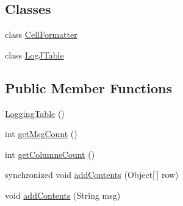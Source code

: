 \subsection*{Classes}
\begin{DoxyCompactItemize}
\item 
class \hyperlink{classit_1_1emarolab_1_1cagg_1_1debugging_1_1baseComponents_1_1LoggingTable_1_1CellFormatter}{Cell\-Formatter}
\item 
class \hyperlink{classit_1_1emarolab_1_1cagg_1_1debugging_1_1baseComponents_1_1LoggingTable_1_1LogJTable}{Log\-J\-Table}
\end{DoxyCompactItemize}
\subsection*{Public Member Functions}
\begin{DoxyCompactItemize}
\item 
\hyperlink{classit_1_1emarolab_1_1cagg_1_1debugging_1_1baseComponents_1_1LoggingTable_a392c75204c792ce527a4376153d33822}{Logging\-Table} ()
\item 
int \hyperlink{classit_1_1emarolab_1_1cagg_1_1debugging_1_1baseComponents_1_1LoggingTable_a9e6c594828ac1de856b271b91cb24795}{get\-Msg\-Count} ()
\item 
int \hyperlink{classit_1_1emarolab_1_1cagg_1_1debugging_1_1baseComponents_1_1LoggingTable_ab6a6289651ee88cf23dc502e17ebfbff}{get\-Columns\-Count} ()
\item 
synchronized void \hyperlink{classit_1_1emarolab_1_1cagg_1_1debugging_1_1baseComponents_1_1LoggingTable_a3aa5ac22f59fe4da0b5ac414cbad6694}{add\-Contents} (Object\mbox{[}$\,$\mbox{]} row)
\item 
void \hyperlink{classit_1_1emarolab_1_1cagg_1_1debugging_1_1baseComponents_1_1LoggingTable_abbdc12208e4229f646031754e8826b87}{add\-Contents} (String msg)
\end{DoxyCompactItemize}
